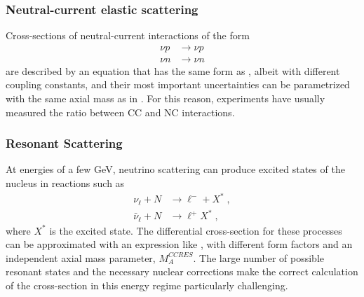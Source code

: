 \subsubsection{Neutral-current elastic scattering}
Cross-sections of neutral-current interactions of the form 
\begin{equation}
\begin{aligned}
    \nu p &\rightarrow \nu p \\
    \nu n &\rightarrow \nu n
\end{aligned}
\end{equation}
are described by an equation that has the same form as , albeit with different coupling constants, and their most important uncertainties can be parametrized with the same axial mass as in . For this reason, experiments have usually measured the ratio between CC and NC interactions.

\subsubsection{Resonant Scattering}
At energies of a few GeV, neutrino scattering can produce excited states of the nucleus in reactions such as
\begin{equation}
\begin{aligned}
    \nu_\ell + N &\rightarrow \ell^- + X^*\;, \\
    \bar{\nu}_\ell + N &\rightarrow \ell^+ X^*\;,
\end{aligned}
\end{equation}
where $X^*$ is the excited state. The differential cross-section for these processes can be approximated with an expression like , with different form factors and an independent axial mass parameter, $M_A^{CCRES}$. The large number of possible resonant states and the necessary nuclear corrections make the correct calculation of the cross-section in this energy regime particularly challenging.

